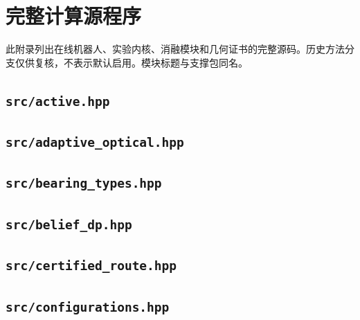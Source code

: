 \section{完整计算源程序}\small 此附录列出在线机器人、实验内核、消融模块和几何证书的完整源码。历史方法分支仅供复核，不表示默认启用。模块标题与支撑包同名。
\subsection*{\texttt{src/active.hpp}}

\subsection*{\texttt{src/adaptive\_optical.hpp}}

\subsection*{\texttt{src/bearing\_types.hpp}}

\subsection*{\texttt{src/belief\_dp.hpp}}

\subsection*{\texttt{src/certified\_route.hpp}}

\subsection*{\texttt{src/configurations.hpp}}

